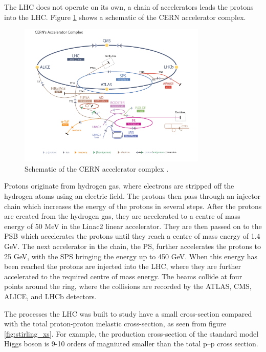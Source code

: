 The \ac{LHC} does not operate on its own, a chain of accelerators leads
the protons into the \ac{LHC}. Figure \ref{fig:lhc_schematic} shows a schematic
of the \ac{CERN} accelerator complex.
\begin{figure}[h!]
\includegraphics[width=0.8\textwidth]{./Detector/Plots/LHC_default.jpg}
\caption{Schematic of the \ac{CERN} accelerator complex \cite{lhc-schematic}.}
\label{fig:lhc_schematic}
\end{figure}
Protons originate from hydrogen gas, where electrons are stripped off the 
hydrogen atoms using an electric field. The protons then pass through an injector
chain which increases the energy of the protons in several steps. After the protons
are created from the hydrogen gas, they are accelerated to a centre of mass energy of
50 MeV in the Linac2 linear accelerator. They are then passed on to the
\acf{PSB} which accelerates the protons until they reach a centre of mass energy of 1.4 GeV.
The next accelerator in the chain, the \acf{PS}, further accelerates the protons to 25 GeV,
with the \acf{SPS} bringing the energy up to 450 GeV. When this energy has been 
reached the protons are injected into the \ac{LHC}, where they are further accelerated to 
the required centre of mass energy. The beams collide at four points
around the ring, where the collisions are recorded by the ATLAS\cite{atlas-jinst}, 
CMS\cite{cms-jinst}, ALICE\cite{alice-jinst}, and LHCb\cite{lhcb-jinst} detectors.

The processes the \ac{LHC} was built to study have a small cross-section
compared with the total proton-proton inelastic cross-section, as seen from figure
\ref{fig:stirling_xs}. For example, the production cross-section of the
standard model Higgs boson is 9-10 orders of magniuted smaller than the total p--p cross section.

